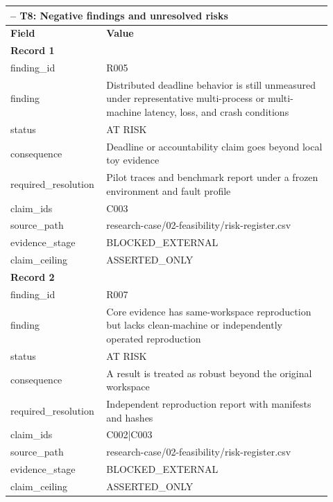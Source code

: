 \begingroup
\setlength{\tabcolsep}{2pt}
\small\sloppy
\begin{longtable}{|p{0.24\linewidth}|p{0.68\linewidth}|}
\hline
\multicolumn{2}{|l|}{\KeystoneDraftTableNotice{} -- T8: Negative findings and unresolved risks} \\ \hline
\textbf{Field} & \textbf{Value} \\ \hline
\multicolumn{2}{|l|}{\textbf{Record 1}} \\ \hline
finding\_\allowbreak{}id & R005 \\ \hline
finding & Distributed deadline behavior is still unmeasured under representative multi-process or multi-machine latency, loss, and crash conditions \\ \hline
status & AT RISK \\ \hline
consequence & Deadline or accountability claim goes beyond local toy evidence \\ \hline
required\_\allowbreak{}resolution & Pilot traces and benchmark report under a frozen environment and fault profile \\ \hline
claim\_\allowbreak{}ids & C003 \\ \hline
source\_\allowbreak{}path & research-case/02-feasibility/risk-register.csv \\ \hline
evidence\_\allowbreak{}stage & BLOCKED\_\allowbreak{}EXTERNAL \\ \hline
claim\_\allowbreak{}ceiling & ASSERTED\_\allowbreak{}ONLY \\ \hline
\multicolumn{2}{|l|}{\textbf{Record 2}} \\ \hline
finding\_\allowbreak{}id & R007 \\ \hline
finding & Core evidence has same-workspace reproduction but lacks clean-machine or independently operated reproduction \\ \hline
status & AT RISK \\ \hline
consequence & A result is treated as robust beyond the original workspace \\ \hline
required\_\allowbreak{}resolution & Independent reproduction report with manifests and hashes \\ \hline
claim\_\allowbreak{}ids & C002|C003 \\ \hline
source\_\allowbreak{}path & research-case/02-feasibility/risk-register.csv \\ \hline
evidence\_\allowbreak{}stage & BLOCKED\_\allowbreak{}EXTERNAL \\ \hline
claim\_\allowbreak{}ceiling & ASSERTED\_\allowbreak{}ONLY \\ \hline

\end{longtable}
